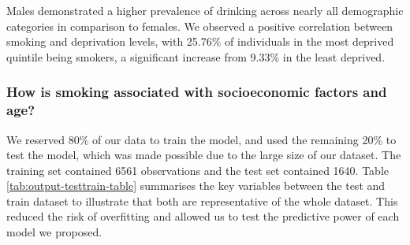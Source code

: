 \documentclass[
  11pt,
  twocolumn]{article}
\begin{document}
Males demonstrated a higher prevalence of drinking across nearly all
demographic categories in comparison to females. We observed a positive
correlation between smoking and deprivation levels, with 25.76\% of
individuals in the most deprived quintile being smokers, a significant
increase from 9.33\% in the least deprived.

\subsubsection{How is smoking associated with socioeconomic factors and
age?}\label{how-is-smoking-associated-with-socioeconomic-factors-and-age}

We reserved 80\% of our data to train the model, and used the remaining
20\% to test the model, which was made possible due to the large size of
our dataset. The training set contained 6561 observations and the test
set contained 1640. Table \ref{tab:output-testtrain-table} summarises
the key variables between the test and train dataset to illustrate that
both are representative of the whole dataset. This reduced the risk of
overfitting and allowed us to test the predictive power of each model we
proposed.
\end{document}

